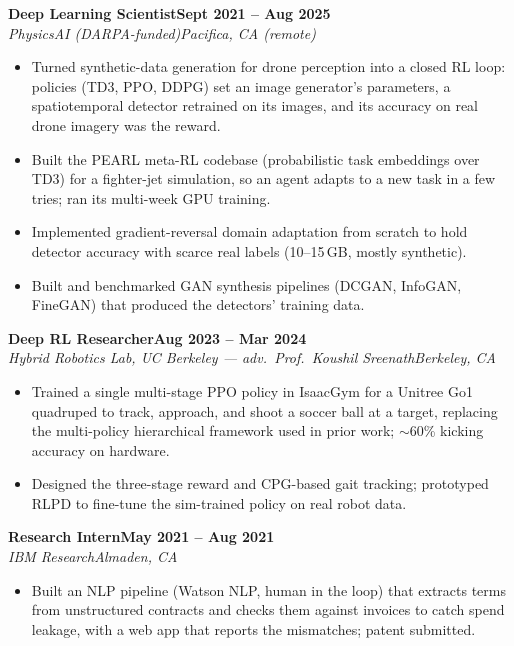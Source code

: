 \documentclass[10pt]{article}
\newcommand{\role}[4]{\textbf{#1}\hfill\textbf{#2}\\\textit{#3}\hfill\textit{#4}}
\begin{document}
\role{Deep Learning Scientist}{Sept 2021 -- Aug 2025}{PhysicsAI (DARPA-funded)}{Pacifica, CA (remote)}
\begin{itemize}
\item Turned synthetic-data generation for drone perception into a closed RL loop: policies (TD3, PPO, DDPG) set an image generator's parameters, a spatiotemporal detector retrained on its images, and its accuracy on real drone imagery was the reward.
\item Built the PEARL meta-RL codebase (probabilistic task embeddings over TD3) for a fighter-jet simulation, so an agent adapts to a new task in a few tries; ran its multi-week GPU training.
\item Implemented gradient-reversal domain adaptation from scratch to hold detector accuracy with scarce real labels (10--15\,GB, mostly synthetic).
\item Built and benchmarked GAN synthesis pipelines (DCGAN, InfoGAN, FineGAN) that produced the detectors' training data.
\end{itemize}

\role{Deep RL Researcher}{Aug 2023 -- Mar 2024}{Hybrid Robotics Lab, UC Berkeley --- adv.\ Prof.\ Koushil Sreenath}{Berkeley, CA}
\begin{itemize}
\item Trained a single multi-stage PPO policy in IsaacGym for a Unitree Go1 quadruped to track, approach, and shoot a soccer ball at a target, replacing the multi-policy hierarchical framework used in prior work; $\sim$60\% kicking accuracy on hardware.
\item Designed the three-stage reward and CPG-based gait tracking; prototyped RLPD to fine-tune the sim-trained policy on real robot data.
\end{itemize}

\role{Research Intern}{May 2021 -- Aug 2021}{IBM Research}{Almaden, CA}
\begin{itemize}
\item Built an NLP pipeline (Watson NLP, human in the loop) that extracts terms from unstructured contracts and checks them against invoices to catch spend leakage, with a web app that reports the mismatches; patent submitted.
\end{itemize}
\end{document}
